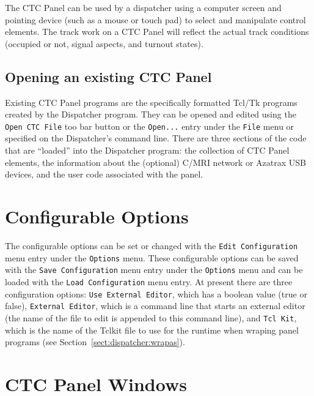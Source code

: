 The CTC Panel can be used by a dispatcher using a computer screen and
pointing device (such as a mouse or touch pad) to select and manipulate
control elements. The track work on a CTC Panel will reflect the actual
track conditions (occupied or not, signal aspects, and turnout states).

\subsection{Opening an existing CTC Panel}

Existing CTC Panel programs are the specifically formatted Tcl/Tk
programs created by the Dispatcher program.  They can be opened and
edited using the \verb=Open CTC File= too bar button or the
\verb=Open...= entry under the \verb=File= menu or specified on the
Dispatcher's command line.  There are three sections of the code that
are ``loaded'' into the Dispatcher program: the collection of CTC Panel
elements, the information about the (optional) C/MRI network or Azatrax
USB devices, and the user code associated with the panel.

\section{Configurable Options}
\label{sect:dispatcher:configopts}

The configurable options can be set or changed with the 
\verb=Edit Configuration= menu entry under the \verb=Options= menu. These
configurable options can be saved with the \verb=Save Configuration=
menu entry under the \verb=Options= menu and can be loaded with the 
\verb=Load Configuration= menu entry.  At present there are three
configuration options: \verb=Use External Editor=, which has a boolean
value (true or false), \verb=External Editor=, which is a
command line that starts an external editor (the name of the file
to edit is appended to this command line), and \verb=Tcl Kit=, which is
the name of the Tclkit file to use for the runtime when wraping panel
programs (see Section~\ref{sect:dispatcher:wrapas}).

\section{CTC Panel Windows}

